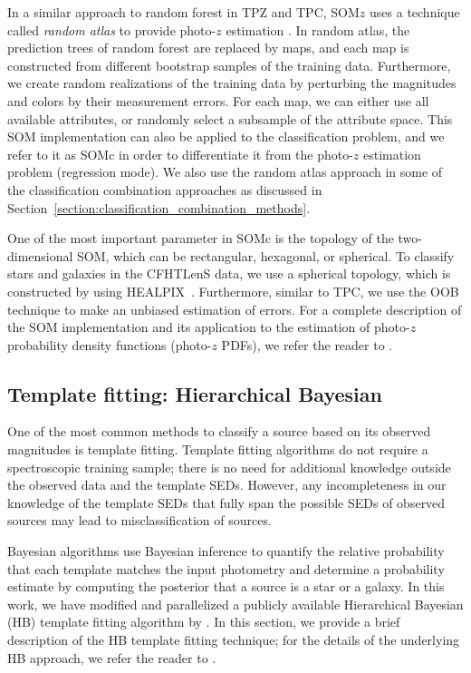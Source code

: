 \documentclass[useAMS,usenatbib]{mn2e}
\begin{document}
In a similar approach to random forest in TPZ and TPC,
SOM$z$ uses a technique called \textit{random atlas}
to provide photo-$z$ estimation \citep{carrascokind2014somz}.
In random atlas, the prediction trees of random forest are replaced by maps,
and each map is constructed from different bootstrap samples
of the training data.
Furthermore, we create random realizations of the training data
by perturbing the magnitudes and colors by their measurement errors.
For each map, we can either use all available attributes,
or randomly select a subsample of the attribute space.
This SOM implementation can also be
applied to the classification problem,
and we refer to it as SOMc
in order to differentiate it from 
the photo-$z$ estimation problem (regression mode).
We also use the random atlas approach
in some of the classification combination approaches as discussed in
Section~\ref{section:classification_combination_methods}.

One of the most important parameter in SOMc
is the topology of the two-dimensional SOM,
which can be rectangular, hexagonal, or spherical.
To classify stars and galaxies in the CFHTLenS data,
we use a spherical topology,
which is constructed by using
\textsc{HEALPIX}~\citep{gorski2005healpix}.
Furthermore, similar to TPC,
we use the OOB technique to make an unbiased estimation of errors.
For a complete description of the SOM implementation
and its application to the estimation of
photo-$z$ probability density functions (photo-$z$ PDFs),
we refer the reader to \cite{carrascokind2014somz}.

\subsection{Template fitting: Hierarchical Bayesian}

One of the most common methods to classify a source
based on its observed magnitudes is template fitting.
Template fitting algorithms do not require a spectroscopic training sample;
there is no need for additional knowledge outside the
observed data and the template SEDs.
However, any incompleteness in our knowledge of the template SEDs
that fully span the possible SEDs of observed sources
may lead to misclassification of sources.

Bayesian algorithms use Bayesian inference to quantify
the relative probability that each template matches
the input photometry
and determine a probability estimate by computing
the posterior that a source is a star or a galaxy.
In this work, we have modified and parallelized
a publicly available Hierarchical Bayesian (HB) template fitting
algorithm by \cite{Fadely2012}.
In this section, we provide a brief description
of the HB template fitting technique;
for the details of the underlying HB approach,
we refer the reader to \cite{Fadely2012}.
\end{document}
